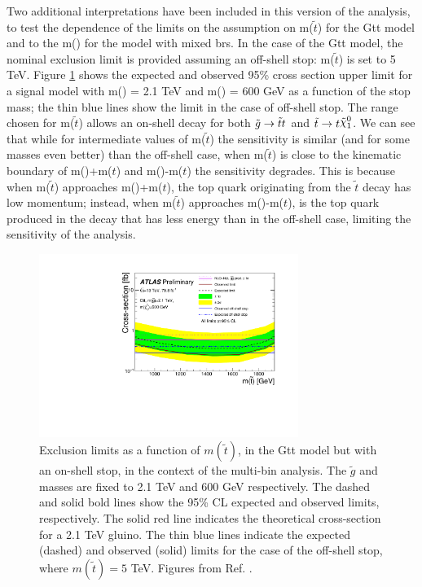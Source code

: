 Two additional interpretations have been included in this version of the analysis, to test the dependence of the limits on the 
assumption on m($\tilde{t}$) for the Gtt model and to the m(\chinoonepm) for the model with mixed \glspl{br}.
In the case of the Gtt model, the nominal exclusion limit is provided assuming an off-shell stop: m($\tilde{t}$) is set to 5 TeV.
Figure \ref{fig:limits_GttOnshell} shows the expected and observed 95\% cross section upper limit for a signal model with 
m(\gluino) = 2.1 TeV and m(\ninoone) = 600 GeV as a function of the stop mass; the thin blue lines 
show the limit in the case of off-shell stop. 
The range chosen for  m($\tilde{t}$) allows an on-shell decay for both 
$\tilde{g} \to \tilde{t}t$ and $\tilde{t} \to t \ninoone$. 
We can see that while for intermediate values of m($\tilde{t}$) the sensitivity is similar (and for some masses even better) 
than the off-shell case, when m($\tilde{t}$) is close to the kinematic boundary of 
m(\ninoone)+m($t$) and m(\gluino)-m($t$) the sensitivity degrades. 
This is because when m($\tilde{t}$) approaches m(\ninoone)+m($t$), the top quark originating from the $\tilde{t}$ decay 
has low momentum; instead, when m($\tilde{t}$) approaches m(\gluino)-m($t$), is the top quark produced in the \gluino 
decay that has less energy than in the off-shell case, limiting the sensitivity of the analysis. 


\begin{figure}
  \centering
  \includegraphics[width=0.75\textwidth]{figures/strong_prod/R21/multibin/Gtt_2100_600_onshell}
  \caption{Exclusion limits as a function of $m(\tilde{t})$, in the Gtt model but with an on-shell stop, in the context of the multi-bin analysis. The $\tilde{g}$ and \ninoone masses are fixed to 2.1 TeV and 600 GeV respectively. The dashed and solid bold lines
    show the 95\% CL expected and observed limits, respectively. The solid red line indicates the theoretical cross-section for a 2.1 TeV gluino. The thin blue lines indicate the expected (dashed) and observed (solid) limits for the case of the off-shell stop, where $m(\tilde{t}) = 5$ TeV.
    Figures from Ref. \cite{ATLAS-CONF-2018-041}.}
  \label{fig:limits_GttOnshell}
\end{figure}

